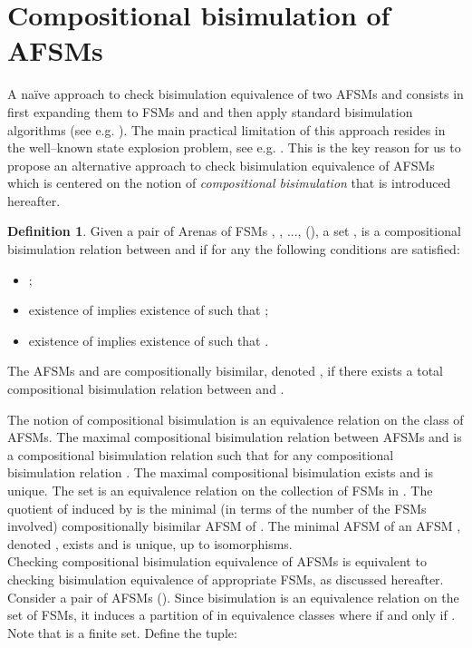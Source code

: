 \documentclass{amsart}
\theoremstyle{definition}
\newtheorem{definition}[theorem]{Definition}
\theoremstyle{remark}
\numberwithin{equation}{section}
\begin{document}
\section{Compositional bisimulation of AFSMs}
A na\"ive approach to check bisimulation equivalence of two AFSMs  and  consists in first expanding them to FSMs  and  and then apply standard bisimulation algorithms (see e.g. \cite{BisAlg,Piazza,Hopcroft}). 
The main practical limitation of this approach resides in the well--known state explosion problem, see e.g. \cite{StateExplosion2,StateExplosion1}.
This is the key reason for us to propose an alternative approach to check bisimulation equivalence of AFSMs which is centered on the notion of \textit{compositional bisimulation} that is introduced hereafter.
\begin{definition}
\label{Hbis}
Given a pair of Arenas 
 of FSMs , , ...,  (), a set 
\mbox{}, is a compositional bisimulation relation between  and  if for any  the following conditions are satisfied:
\begin{itemize}
\item ;
\item existence of  implies existence of  such that ;
\item existence of  implies existence of  such that .
\end{itemize}
The AFSMs  and  are compositionally bisimilar, denoted , if there exists a total compositional bisimulation relation between  and .
\end{definition}
The notion of compositional bisimulation is an equivalence relation on the class of AFSMs. The maximal compositional bisimulation relation between AFSMs  and  is a compositional bisimulation relation  such that  for any compositional bisimulation relation . The maximal compositional bisimulation exists and is unique. 
The set  is an equivalence relation on the collection of FSMs in . 
The quotient
of  induced by  is the minimal (in terms of the number of the FSMs involved) compositionally bisimilar AFSM of . The minimal AFSM of an AFSM , denoted , exists and is unique, up to isomorphisms. \\
Checking compositional bisimulation equivalence of AFSMs is equivalent to checking bisimulation equivalence of appropriate FSMs, as discussed hereafter. Consider a pair of AFSMs  (). 
Since bisimulation is an equivalence relation on the set  of FSMs, it induces a partition of  in  equivalence classes  where  if and only if . Note that  is a finite set. Define the tuple: 
\end{document}
